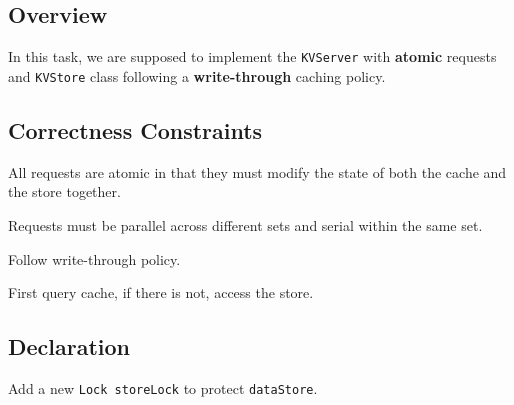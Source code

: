 \documentclass{article}
\begin{document}
\subsection{Overview}
In this task, we are supposed to implement the \texttt{KVServer} with \textbf{atomic} requests
and \texttt{KVStore} class following a \textbf{write-through} caching policy.
\subsection{Correctness Constraints}
\begin{compactitem}
	\item All requests are atomic in that they must modify the state of both the cache and the store together.
	\item Requests must be parallel across different sets and serial within the same set.
	\item Follow write-through policy.
	\item First query cache, if there is not, access the store.
\end{compactitem}
\subsection{Declaration}
Add a new \texttt{Lock storeLock} to protect \texttt{dataStore}.
\end{document}
